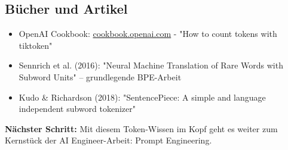 \subsection{Bücher und Artikel}

\begin{itemize}[leftmargin=*]
    \item OpenAI Cookbook: \href{https://cookbook.openai.com}{cookbook.openai.com} - "How to count tokens with tiktoken"
    \item Sennrich et al. (2016): "Neural Machine Translation of Rare Words with Subword Units" -- grundlegende BPE-Arbeit
    \item Kudo \& Richardson (2018): "SentencePiece: A simple and language independent subword tokenizer"
\end{itemize}

\textbf{Nächster Schritt:} Mit diesem Token-Wissen im Kopf geht es weiter zum Kernstück der AI Engineer-Arbeit: Prompt Engineering.
